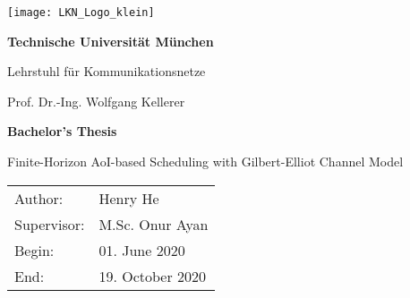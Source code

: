 \thispagestyle{empty}
\newpage

\vspace{5cm}
  \begin{center}
        \texttt{[image: LKN\_Logo\_klein]}
  \end{center}

\begin{center} {\sf\bf 
                               \Large  Technische Universität München
                                \smallskip

                               \Large Lehrstuhl für Kommunikationsnetze
                               \smallskip
                              }

                              {\sf \large Prof. Dr.-Ing. Wolfgang Kellerer} 
\end{center}  

\vspace{4cm}

\begin{center}
        {\bf\Huge Bachelor's Thesis} %
\end{center}

\begin{center}
        \settowidth{\baselineskip}{0.4cm}
        {\LARGE 
        Finite-Horizon AoI-based Scheduling with Gilbert-Elliot Channel Model
        }
\end{center}

\vfill         
{\settowidth{\baselineskip}{0.2cm}
\large\begin{tabular}[l]{ll}
Author: & Henry He\\
Supervisor: & M.Sc. Onur Ayan\\
Begin: & 01. June 2020\\
End: & 19. October 2020
\end{tabular}}
